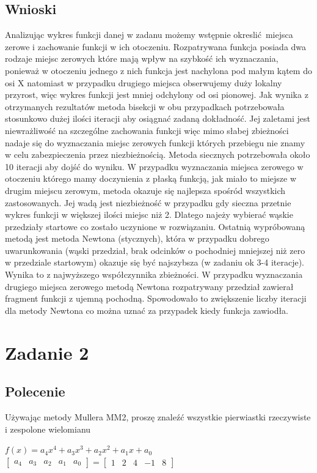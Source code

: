 \documentclass[a4paper, 11pt]{article}
\begin{document}
\subsection{Wnioski}
Analizując wykres funkcji danej w zadanu możemy wstępnie okreslić miejsca zerowe i zachowanie funkcji w ich otoczeniu. Rozpatrywana funkcja posiada dwa rodzaje miejsc zerowych które mają wpływ na szybkość ich wyznaczania, ponieważ w otoczeniu jednego z nich funkcja jest nachylona pod małym kątem do osi X natomiast w przypadku drugiego miejsca obserwujemy duży lokalny przyrost, więc wykres funkcji jest mniej odchylony od osi pionowej. Jak wynika z otrzymanych rezultatów metoda bisekcji w obu przypadkach potrzebowała stosunkowo dużej ilości iteracji aby osiągnać zadaną dokładność. Jej zaletami jest niewrażliwość na szczególne zachowania funkcji więc mimo słabej zbieżności nadaje się do wyznaczania miejsc zerowych funkcji których przebiegu nie znamy w celu zabezpieczenia przez niezbieżnością. Metoda siecznych potrzebowała około 10 iteracji aby dojść do wyniku. W przypadku wyznaczania miejsca zerowego w otoczeniu którego mamy doczynienia z płaską funkcją, jak miało to miejsze w drugim miejscu zerowym, metoda okazuje się najlepsza spośród wszystkich zastosowanych. Jej wadą jest niezbieżność w przypadku gdy sieczna przetnie wykres funkcji w większej ilości miejsc niż 2. Dlatego najeży wybierać wąskie przedziały startowe co zostało uczynione w rozwiązaniu. Ostatnią wypróbowaną metodą jest metoda Newtona (stycznych), która w przypadku dobrego uwarunkowania (wąski przedział, brak odcinków o pochodniej mniejszej niż zero w przedziale startowym) okazuje się być najszybsza (w zadaniu ok 3-4 iteracje). Wynika to z najwyższego współczynnika zbieżności. W przypadku wyznaczania drugiego miejsca zerowego metodą Newtona rozpatrywany przedział zawierał fragment funkcji z ujemną pochodną. Spowodowało to zwiększenie liczby iteracji dla metody Newtona co można uznać za przypadek kiedy funkcja zawiodła. 


\section{Zadanie 2}

\subsection{Polecenie}
Używając metody Mullera MM2, proszę znaleźć wszystkie pierwiastki rzeczywiste i zespolone wielomianu
\begin{center}
$f(x) = a_{4}x^4+a_{3}x^3+a_{2}x^2+a_{1}x+a_{0}$ 
$
\left[
\begin{array}{ccccc}
       a_{4} & a_{3} & a_{2} & a_{1} & a_{0}
\end{array}
\right]
=
\left[
\begin{array}{ccccc}
       1 & 2 & 4 & -1 & 8
\end{array}
\right]$
\end{center}
\end{document}
